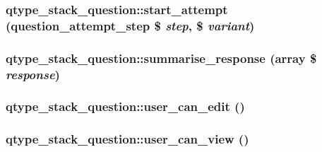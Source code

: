 \label{classqtype__stack__question_a6710a5a63ad311ca3c87618ffad2cb95}
\hypertarget{classqtype__stack__question_a99a663e62b22a8047beb740d24008cb9}{
\subsubsection[{start\_\-attempt}]{\setlength{\rightskip}{0pt plus 5cm}qtype\_\-stack\_\-question::start\_\-attempt (question\_\-attempt\_\-step \$ {\em step}, \/  \$ {\em variant})}}
\label{classqtype__stack__question_a99a663e62b22a8047beb740d24008cb9}
\hypertarget{classqtype__stack__question_a56a30cee9eee5292377c3ab805e5a2b9}{
\subsubsection[{summarise\_\-response}]{\setlength{\rightskip}{0pt plus 5cm}qtype\_\-stack\_\-question::summarise\_\-response (array \$ {\em response})}}
\label{classqtype__stack__question_a56a30cee9eee5292377c3ab805e5a2b9}
\hypertarget{classqtype__stack__question_ab652d314f92aac506494bc3bd7373f0c}{
\subsubsection[{user\_\-can\_\-edit}]{\setlength{\rightskip}{0pt plus 5cm}qtype\_\-stack\_\-question::user\_\-can\_\-edit ()}}
\label{classqtype__stack__question_ab652d314f92aac506494bc3bd7373f0c}
\hypertarget{classqtype__stack__question_a5440ac82608c7f9cb7e1a9490964b636}{
\subsubsection[{user\_\-can\_\-view}]{\setlength{\rightskip}{0pt plus 5cm}qtype\_\-stack\_\-question::user\_\-can\_\-view ()}}
